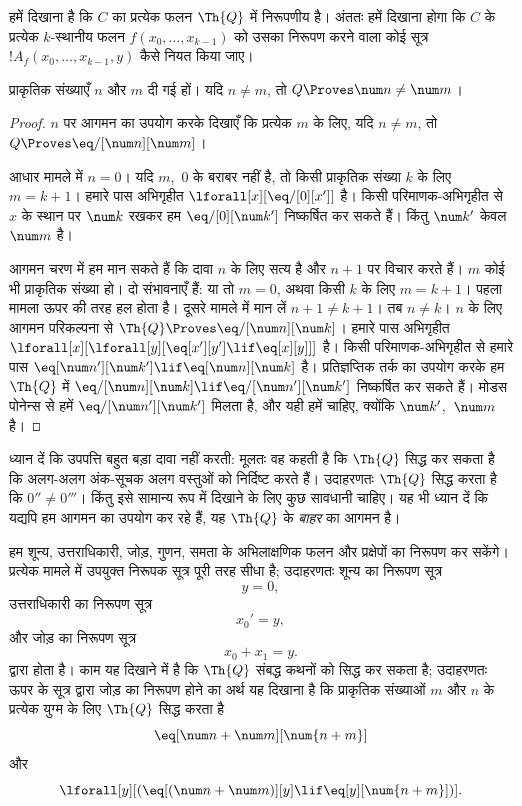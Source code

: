 \documentclass[../../../include/open-logic-section]{subfiles}
\begin{document}

हमें दिखाना है कि $C$ का प्रत्येक फलन $\Th{Q}$ में निरूपणीय है। अंततः
हमें दिखाना होगा कि $C$ के प्रत्येक $k$-स्थानीय फलन
$f(x_0,\dots,x_{k-1})$ को उसका निरूपण करने वाला कोई सूत्र
$!A_f(x_0,\dots,x_{k-1},y)$ कैसे नियत किया जाए।

\begin{lem}
प्राकृतिक संख्याएँ $n$ और $m$ दी गई हों। यदि $n \neq m$, तो
$Q \Proves \num n \neq \num m$।
\end{lem}

\begin{proof}
$n$ पर आगमन का उपयोग करके दिखाएँ कि प्रत्येक $m$ के लिए, यदि $n \neq m$,
तो $Q \Proves \eq/[\num n][\num m]$।

आधार मामले में $n = 0$। यदि $m$,~$0$ के बराबर नहीं है, तो किसी प्राकृतिक
संख्या $k$ के लिए $m = k + 1$। हमारे पास अभिगृहीत
$\lforall[x][\eq/[0][x']]$ है। किसी परिमाणक-अभिगृहीत से $x$ के स्थान पर
$\num k$ रखकर हम $\eq/[0][\num k']$ निष्कर्षित कर सकते हैं। किंतु
$\num k'$ केवल $\num m$ है।

आगमन चरण में हम मान सकते हैं कि दावा $n$ के लिए सत्य है और $n+1$ पर विचार
करते हैं। $m$ कोई भी प्राकृतिक संख्या हो। दो संभावनाएँ हैं: या तो $m = 0$,
अथवा किसी $k$ के लिए $m = k+1$। पहला मामला ऊपर की तरह हल होता है। दूसरे
मामले में मान लें $n+1 \neq k+1$। तब $n \neq k$। $n$ के लिए आगमन
परिकल्पना से $\Th{Q} \Proves \eq/[\num n][\num k]$। हमारे पास अभिगृहीत
$\lforall[x][\lforall[y][\eq[x'][y'] \lif \eq[x][y]]]$ है। किसी
परिमाणक-अभिगृहीत से हमारे पास
$\eq[\num n'][\num k'] \lif \eq[\num n][\num k]$ है। प्रतिज्ञप्तिक तर्क
का उपयोग करके हम $\Th{Q}$ में
$\eq/[\num n][\num k] \lif \eq/[\num n'][\num k']$ निष्कर्षित कर सकते
हैं। मोडस पोनेन्स से हमें $\eq/[\num n'][\num k']$ मिलता है, और यही हमें
चाहिए, क्योंकि $\num k'$,~$\num m$ है।
\end{proof}

ध्यान दें कि उपपत्ति बहुत बड़ा दावा नहीं करती: मूलतः वह कहती है कि
$\Th{Q}$ सिद्ध कर सकता है कि अलग-अलग अंक-सूचक अलग वस्तुओं को निर्दिष्ट
करते हैं। उदाहरणतः $\Th{Q}$ सिद्ध करता है कि $0'' \neq 0'''$। किंतु इसे
सामान्य रूप में दिखाने के लिए कुछ सावधानी चाहिए। यह भी ध्यान दें कि यद्यपि
हम आगमन का उपयोग कर रहे हैं, यह $\Th{Q}$ के \emph{बाहर} का आगमन है।

हम शून्य, उत्तराधिकारी, जोड़, गुणन, समता के अभिलाक्षणिक फलन और प्रक्षेपों
का निरूपण कर सकेंगे। प्रत्येक मामले में उपयुक्त निरूपक सूत्र पूरी तरह सीधा
है; उदाहरणतः शून्य का निरूपण सूत्र
\[
y = 0,
\]
उत्तराधिकारी का निरूपण सूत्र
\[
x_0' = y,
\]
और जोड़ का निरूपण सूत्र
\[
x_0 + x_1 = y.
\]
द्वारा होता है। काम यह दिखाने में है कि $\Th{Q}$ संबद्ध कथनों को सिद्ध कर
सकता है; उदाहरणतः ऊपर के सूत्र द्वारा जोड़ का निरूपण होने का अर्थ यह
दिखाना है कि प्राकृतिक संख्याओं $m$ और $n$ के प्रत्येक युग्म के लिए
$\Th{Q}$ सिद्ध करता है
\[
\eq[\num n + \num m][\num {n+m}]
\]
और
\[
\lforall[y][(\eq[(\num n + \num m)][y] \lif \eq[y][\num {n+m}])].
\]
\end{document}
